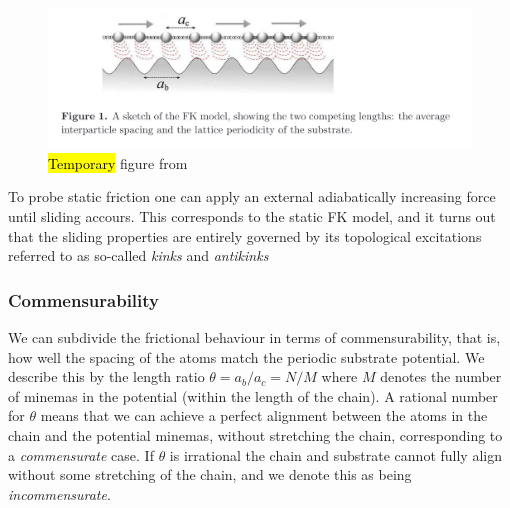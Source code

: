 \begin{figure}[H]
  \centering
  \includegraphics[width=0.8\linewidth]{figures/theory/FK_model.png}
  \caption{\hl{Temporary} figure from \cite{Manini_2016}}
  \label{fig:FK_model}
\end{figure}

To probe static friction one can apply an external adiabatically increasing force until sliding accours. This corresponds to the static \acrshort{FK} model, and it turns out that the sliding properties are entirely governed by its topological excitations referred to as so-called \textit{kinks} and \textit{antikinks}

\subsubsection{Commensurability} We can subdivide the frictional behaviour in terms of commensurability, that is, how well the spacing of the atoms match the periodic substrate potential. We describe this by the length ratio $\theta = a_b / a_c = N / M$ where $M$ denotes the number of minemas in the potential (within the length of the chain). A rational number for $\theta$ means that we can achieve a perfect alignment between the atoms in the chain and the potential minemas, without stretching the chain, corresponding to a \textit{commensurate} case. If $\theta$ is irrational the chain and substrate cannot fully align without some stretching of the chain, and we denote this as being \textit{incommensurate}.

